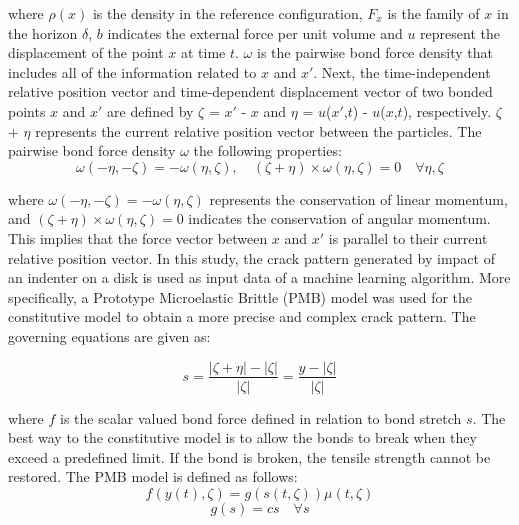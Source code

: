 \noindent where $\rho(x)$ is the density in the reference configuration, $F_x$ is the family of $x$ in the horizon $\delta$, $b$ indicates the external force per unit volume and $u$ represent the displacement of the point $x$ at time $t$. $\omega$ is the pairwise bond force density that includes all of the information related to $x$ and ${x'}$.
Next, the time-independent relative position vector and time-dependent displacement vector of two bonded points $x$ and ${x'}$ are defined by $\zeta$ = ${x'}$ - $x$ and $\eta$ = $u$(${x'}$,$t$) - $u$($x$,$t$), respectively.
$\zeta$ + $\eta$ represents the current relative position vector between the particles. The pairwise bond force density $\omega$ {} the following properties: 
\begin{equation}
\omega(-\eta,-\zeta)= -\omega(\eta, \zeta),\quad(\zeta + \eta)\times\omega(\eta, \zeta)=0 \quad\forall\eta,\zeta
\end{equation}




\noindent where $\omega(-\eta,-\zeta)= -\omega(\eta, \zeta)$ represents the conservation of linear momentum, and $(\zeta + \eta)\times\omega(\eta, \zeta)=0$ indicates the conservation of angular momentum. This implies that the force vector between $x$ and ${x'}$ is parallel to their current relative position vector. In this study, the crack pattern generated by impact of an indenter on a disk is used as input data of a machine learning algorithm. More specifically, a Prototype Microelastic Brittle (PMB) model \cite{Ref4} was used for the constitutive model to obtain a more precise and complex crack pattern. The governing equations are given as: 

\begin{equation}
s=\frac{|\zeta+\eta|-|\zeta|}{|\zeta|}=\frac{y-|\zeta|}{|\zeta|}
\end{equation}

\noindent where $f$ is the scalar valued bond force defined in relation to bond stretch $s$. The best way {} to the constitutive model is to allow the bonds to break when they exceed a predefined limit. If the bond is broken, the tensile strength cannot be restored. The PMB model is defined as follows:
\begin{equation}
f(y(t),\zeta)=g(s(t,\zeta))\mu(t,\zeta)
\end{equation}
\begin{equation}
g(s)=cs \quad\forall s
\end{equation}

